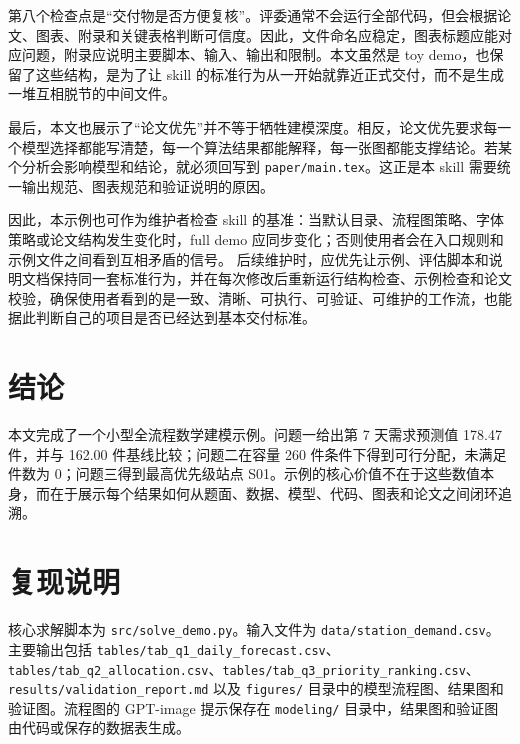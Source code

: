 \documentclass[12pt]{ctexart}
\begin{document}
第八个检查点是“交付物是否方便复核”。评委通常不会运行全部代码，但会根据论文、图表、附录和关键表格判断可信度。因此，文件命名应稳定，图表标题应能对应问题，附录应说明主要脚本、输入、输出和限制。本文虽然是 toy demo，也保留了这些结构，是为了让 skill 的标准行为从一开始就靠近正式交付，而不是生成一堆互相脱节的中间文件。

最后，本文也展示了“论文优先”并不等于牺牲建模深度。相反，论文优先要求每一个模型选择都能写清楚，每一个算法结果都能解释，每一张图都能支撑结论。若某个分析会影响模型和结论，就必须回写到 \texttt{paper/main.tex}。这正是本 skill 需要统一输出规范、图表规范和验证说明的原因。

因此，本示例也可作为维护者检查 skill 的基准：当默认目录、流程图策略、字体策略或论文结构发生变化时，full demo 应同步变化；否则使用者会在入口规则和示例文件之间看到互相矛盾的信号。
后续维护时，应优先让示例、评估脚本和说明文档保持同一套标准行为，并在每次修改后重新运行结构检查、示例检查和论文校验，确保使用者看到的是一致、清晰、可执行、可验证、可维护的工作流，也能据此判断自己的项目是否已经达到基本交付标准。

\section{结论}

本文完成了一个小型全流程数学建模示例。问题一给出第 7 天需求预测值 178.47 件，并与 162.00 件基线比较；问题二在容量 260 件条件下得到可行分配，未满足件数为 0；问题三得到最高优先级站点 S01。示例的核心价值不在于这些数值本身，而在于展示每个结果如何从题面、数据、模型、代码、图表和论文之间闭环追溯。

\section{复现说明}

核心求解脚本为 \texttt{src/solve\_demo.py}。输入文件为 \texttt{data/station\_demand.csv}。主要输出包括 \texttt{tables/tab\_q1\_daily\_forecast.csv}、\texttt{tables/tab\_q2\_allocation.csv}、\texttt{tables/tab\_q3\_priority\_ranking.csv}、\texttt{results/validation\_report.md} 以及 \texttt{figures/} 目录中的模型流程图、结果图和验证图。流程图的 GPT-image 提示保存在 \texttt{modeling/} 目录中，结果图和验证图由代码或保存的数据表生成。
\end{document}
